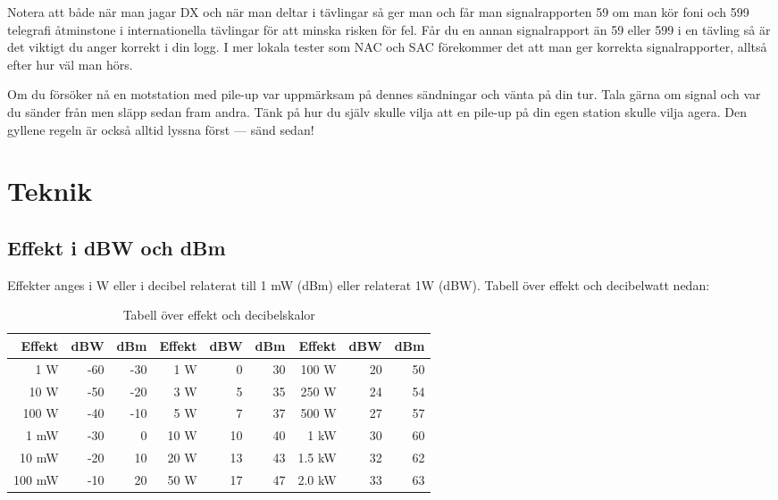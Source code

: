 Notera att både när man jagar DX och när man deltar i tävlingar så ger man och
får man signalrapporten 59 om man kör foni och 599 telegrafi åtminstone i
internationella tävlingar för att minska risken för fel. Får du en annan
signalrapport än 59 eller 599 i en tävling så är det viktigt du anger korrekt i
din logg. I mer lokala tester som NAC och SAC förekommer det att man ger
korrekta signalrapporter, alltså efter hur väl man hörs.

Om du försöker nå en motstation med pile-up var uppmärksam på dennes sändningar
och vänta på din tur. Tala gärna om signal och var du sänder från men släpp
sedan fram andra. Tänk på hur du själv skulle vilja att en pile-up på din egen
station skulle vilja agera. Den gyllene regeln är också alltid lyssna först ---
sänd sedan!


\newpage

\section{Teknik}

\subsection{Effekt i dBW och dBm}

Effekter anges i W eller i decibel relaterat till 1 mW (dBm) eller
relaterat 1W (dBW). Tabell över effekt och decibelwatt nedan:

\begin{table}[H]
\centering
\begin{tabular}{rrr|rrr|rrr}
	\textbf{Effekt} & \textbf{dBW} & \textbf{dBm} & \textbf{Effekt} & \textbf{dBW} & \textbf{dBm} & \textbf{Effekt} & \textbf{dBW} & \textbf{dBm} \\ \hline
	    1 \textmu W &          -60 &          -30 &             1 W &            0 &           30 &           100 W &           20 &           50 \\
	   10 \textmu W &          -50 &          -20 &             3 W &            5 &           35 &           250 W &           24 &           54 \\
	  100 \textmu W &          -40 &          -10 &             5 W &            7 &           37 &           500 W &           27 &           57 \\
	           1 mW &          -30 &            0 &            10 W &           10 &           40 &            1 kW &           30 &           60 \\
	          10 mW &          -20 &           10 &            20 W &           13 &           43 &          1.5 kW &           32 &           62 \\
	         100 mW &          -10 &           20 &            50 W &           17 &           47 &          2.0 kW &           33 &           63
\end{tabular}
\caption{Tabell över effekt och decibelskalor}
\end{table}


